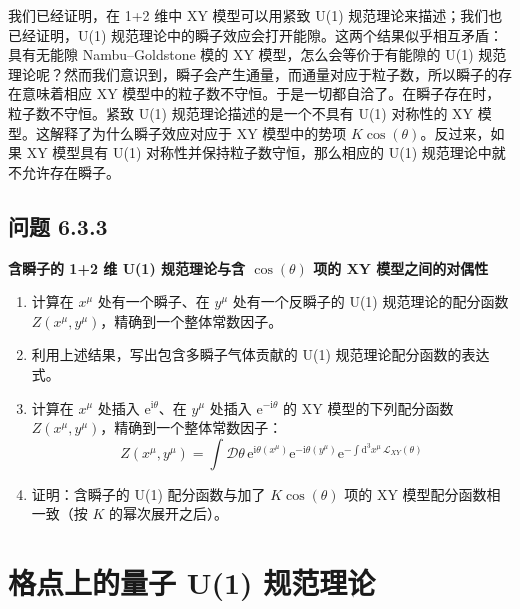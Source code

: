 我们已经证明，在 1+2 维中 XY 模型可以用紧致 U(1) 规范理论来描述；我们也已经证明，U(1) 规范理论中的瞬子效应会打开能隙。这两个结果似乎相互矛盾：具有无能隙 Nambu--Goldstone 模的 XY 模型，怎么会等价于有能隙的 U(1) 规范理论呢？然而我们意识到，瞬子会产生通量，而通量对应于粒子数，所以瞬子的存在意味着相应 XY 模型中的粒子数不守恒。于是一切都自洽了。在瞬子存在时，粒子数不守恒。紧致 U(1) 规范理论描述的是一个不具有 U(1) 对称性的 XY 模型。这解释了为什么瞬子效应对应于 XY 模型中的势项 $K\cos(\theta)$。反过来，如果 XY 模型具有 U(1) 对称性并保持粒子数守恒，那么相应的 U(1) 规范理论中就不允许存在瞬子。


\subsection*{问题 6.3.3}

\textbf{含瞬子的 1+2 维 U(1) 规范理论与含 $\cos(\theta)$ 项的 XY 模型之间的对偶性}

\begin{enumerate}
\item 计算在 $x^{\mu}$ 处有一个瞬子、在 $y^{\mu}$ 处有一个反瞬子的 U(1) 规范理论的配分函数 $Z(x^{\mu},y^{\mu})$，精确到一个整体常数因子。
\item 利用上述结果，写出包含多瞬子气体贡献的 U(1) 规范理论配分函数的表达式。
\item 计算在 $x^{\mu}$ 处插入 $\mathrm{e}^{\mathrm{i}\theta}$、在 $y^{\mu}$ 处插入 $\mathrm{e}^{-\mathrm{i}\theta}$ 的 XY 模型的下列配分函数 $Z(x^{\mu},y^{\mu})$，精确到一个整体常数因子：
\begin{equation*}
Z(x^{\mu},y^{\mu})=\int\mathcal{D}\theta\,\mathrm{e}^{\mathrm{i}\theta(x^{\mu})}\mathrm{e}^{-\mathrm{i}\theta(y^{\mu})}\mathrm{e}^{-\int\mathrm{d}^{3}x^{\mu}\,\mathcal{L}_{XY}(\theta)}
\end{equation*}
\item 证明：含瞬子的 U(1) 配分函数与加了 $K\cos(\theta)$ 项的 XY 模型配分函数相一致（按 $K$ 的幂次展开之后）。
\end{enumerate}

\section{格点上的量子 U(1) 规范理论}


